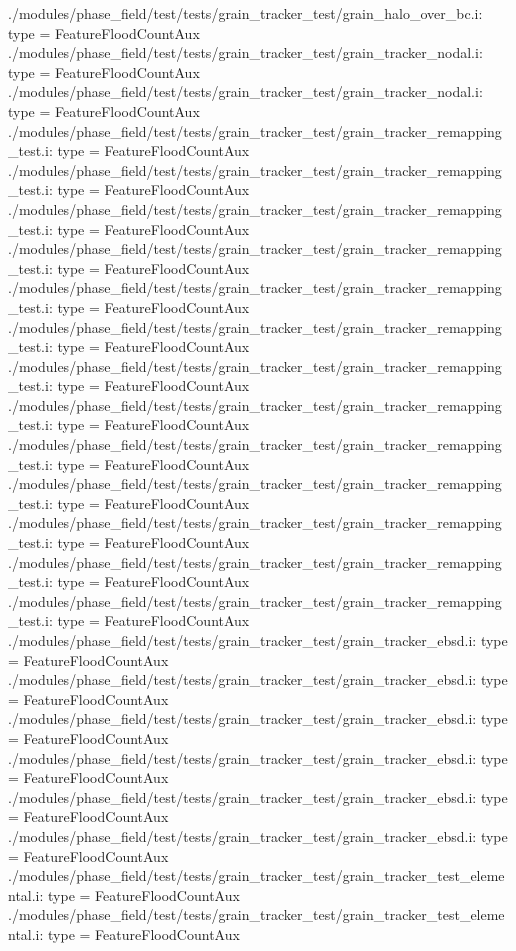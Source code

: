 ./modules/phase_field/test/tests/grain_tracker_test/grain_halo_over_bc.i:    type = FeatureFloodCountAux
./modules/phase_field/test/tests/grain_tracker_test/grain_tracker_nodal.i:    type = FeatureFloodCountAux
./modules/phase_field/test/tests/grain_tracker_test/grain_tracker_nodal.i:    type = FeatureFloodCountAux
./modules/phase_field/test/tests/grain_tracker_test/grain_tracker_remapping_test.i:    type = FeatureFloodCountAux
./modules/phase_field/test/tests/grain_tracker_test/grain_tracker_remapping_test.i:    type = FeatureFloodCountAux
./modules/phase_field/test/tests/grain_tracker_test/grain_tracker_remapping_test.i:    type = FeatureFloodCountAux
./modules/phase_field/test/tests/grain_tracker_test/grain_tracker_remapping_test.i:    type = FeatureFloodCountAux
./modules/phase_field/test/tests/grain_tracker_test/grain_tracker_remapping_test.i:    type = FeatureFloodCountAux
./modules/phase_field/test/tests/grain_tracker_test/grain_tracker_remapping_test.i:    type = FeatureFloodCountAux
./modules/phase_field/test/tests/grain_tracker_test/grain_tracker_remapping_test.i:    type = FeatureFloodCountAux
./modules/phase_field/test/tests/grain_tracker_test/grain_tracker_remapping_test.i:    type = FeatureFloodCountAux
./modules/phase_field/test/tests/grain_tracker_test/grain_tracker_remapping_test.i:    type = FeatureFloodCountAux
./modules/phase_field/test/tests/grain_tracker_test/grain_tracker_remapping_test.i:    type = FeatureFloodCountAux
./modules/phase_field/test/tests/grain_tracker_test/grain_tracker_remapping_test.i:    type = FeatureFloodCountAux
./modules/phase_field/test/tests/grain_tracker_test/grain_tracker_remapping_test.i:    type = FeatureFloodCountAux
./modules/phase_field/test/tests/grain_tracker_test/grain_tracker_remapping_test.i:    type = FeatureFloodCountAux
./modules/phase_field/test/tests/grain_tracker_test/grain_tracker_ebsd.i:    type = FeatureFloodCountAux
./modules/phase_field/test/tests/grain_tracker_test/grain_tracker_ebsd.i:    type = FeatureFloodCountAux
./modules/phase_field/test/tests/grain_tracker_test/grain_tracker_ebsd.i:    type = FeatureFloodCountAux
./modules/phase_field/test/tests/grain_tracker_test/grain_tracker_ebsd.i:    type = FeatureFloodCountAux
./modules/phase_field/test/tests/grain_tracker_test/grain_tracker_ebsd.i:    type = FeatureFloodCountAux
./modules/phase_field/test/tests/grain_tracker_test/grain_tracker_ebsd.i:    type = FeatureFloodCountAux
./modules/phase_field/test/tests/grain_tracker_test/grain_tracker_test_elemental.i:    type = FeatureFloodCountAux
./modules/phase_field/test/tests/grain_tracker_test/grain_tracker_test_elemental.i:    type = FeatureFloodCountAux
